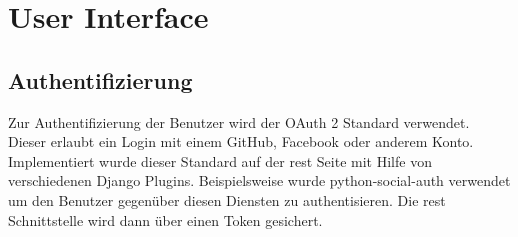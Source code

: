 

\section{User Interface}
\subsection{Authentifizierung}
Zur Authentifizierung der Benutzer wird der OAuth 2 Standard verwendet. Dieser erlaubt ein Login mit einem GitHub, Facebook oder anderem Konto. Implementiert wurde dieser Standard auf der \acs{rest} Seite mit Hilfe von verschiedenen Django Plugins. 
Beispielsweise wurde python-social-auth verwendet um den Benutzer gegenüber diesen Diensten zu authentisieren. Die \acs{rest} Schnittstelle wird dann über einen Token gesichert.

